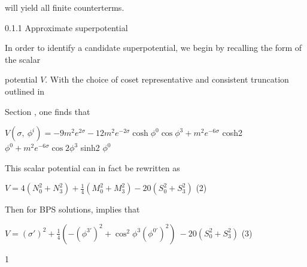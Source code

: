 \documentclass[a4paper,12pt]{article}
\begin{document}
will yield all finite counterterms.

0.1.1 Approximate superpotential

In order to identify a candidate superpotential, we begin by recalling the form of the scalar

potential $V$. With the choice of coset representative and consistent truncation outlined in

Section , one finds that

$V(\sigma,\ \phi^{i})=-9m^{2}e^{2\sigma}-12m^{2}e^{-2\sigma}\cosh\phi^{0}\cos\phi^{3}+m^{2}e^{-6\sigma}$ cosh2 $\phi^{0}+m^{2}e^{-6\sigma}\cos 2\phi^{3}$ sinh2 $\phi^{0}$

This scalar potential can in fact be rewritten as
\begin{center}
$V=4(N_{0}^{2}+N_{3}^{2})+\displaystyle \frac{1}{4}(M_{0}^{2}+M_{3}^{2})-20(S_{0}^{2}+S_{3}^{2})$   (2)
\end{center}
Then for BPS solutions, implies that
\begin{center}
$V=(\displaystyle \sigma')^{2}+\frac{1}{4}(-(\phi^{3'})^{2}+\cos^{2}\phi^{3}(\phi^{0'})^{2})\ -20(S_{0}^{2}+S_{3}^{2})$   (3)
\end{center}
1
\end{document}
